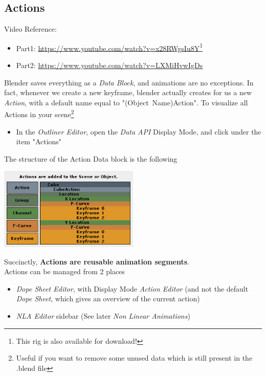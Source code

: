 \documentclass{article}
\begin{document}
\subsection{Actions}
Video Reference: 
\begin{itemize}[noitemsep, topsep=0pt]
    \item Part1: \href{https://www.youtube.com/watch?v=x28RWgsIu8Y}{https://www.youtube.com/watch?v=x28RWgsIu8Y}\footnote{This rig is also available for download!}
    \item Part2: \href{https://www.youtube.com/watch?v=LXMiHvwIgDs}{https://www.youtube.com/watch?v=LXMiHvwIgDs}
\end{itemize}
Blender saves everything as a \textit{Data Block}, and animations are no exceptions. In fact, whenever we create a new keyframe, blender actually creates for us a new \textit{Action}, with a 
default name equal to \mbox{"(Object Name)Action"}. To visualize all Actions in your scene\footnote{Useful if you want to remove some unused data which is still present in the .blend file}
\begin{itemize}[noitemsep, topsep=0pt]
    \item In the \textit{Outliner Editor}, open the \textit{Data API} Display Mode, and click under the item "Actions"
\end{itemize}
The structure of the Action Data block is the following
\begin{center}
    \includegraphics[width=0.5\textwidth]{blender_docs_images/animation_actions_data3.png}
\end{center}
Succinctly, \textbf{Actions are reusable animation segments}.\\
Actions can be managed from 2 places
\begin{itemize}[noitemsep, topsep=0pt]
    \item \textit{Dope Sheet Editor}, with Display Mode \textit{Action Editor} (and not the default \textit{Dope Sheet}, which gives an overview of the current action)
    \item \textit{NLA Editor} sidebar (See later \textit{Non Linear Animations})
\end{itemize}
\end{document}
